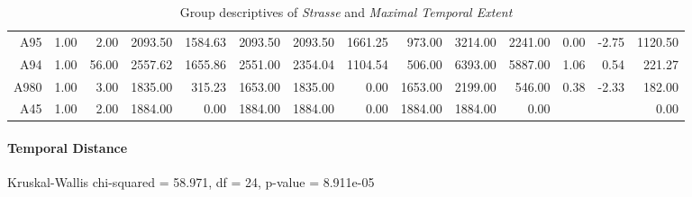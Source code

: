 \begin{table}[ht!]
\begin{tabular}{rrrrrrrrrrrrrr}
    A95  & 1.00 & 2.00 & 2093.50 & 1584.63 & 2093.50 & 2093.50 & 1661.25 & 973.00 & 3214.00 & 2241.00 & 0.00 & -2.75 & 1120.50 \\ 
    A94  & 1.00 & 56.00 & 2557.62 & 1655.86 & 2551.00 & 2354.04 & 1104.54 & 506.00 & 6393.00 & 5887.00 & 1.06 & 0.54 & 221.27 \\ 
    A980 & 1.00 & 3.00 & 1835.00 & 315.23 & 1653.00 & 1835.00 & 0.00 & 1653.00 & 2199.00 & 546.00 & 0.38 & -2.33 & 182.00 \\ 
    A45  & 1.00 & 2.00 & 1884.00 & 0.00 & 1884.00 & 1884.00 & 0.00 & 1884.00 & 1884.00 & 0.00 &  &  & 0.00 \\ 
    \hline
  \end{tabular}
	\caption{Group descriptives of \textit{Strasse} and \textit{Maximal Temporal Extent}}
	\label{tbl:descriptives_baysis_matched_Strasse_TMax}
\end{table}

\paragraph{Temporal Distance}
Kruskal-Wallis chi-squared = 58.971, df = 24, p-value = 8.911e-05

